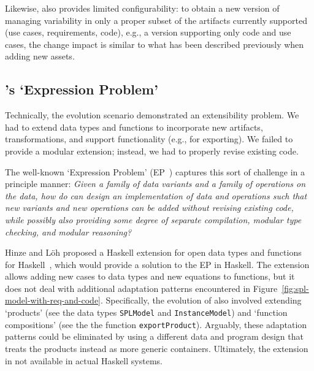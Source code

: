Likewise, \hp{} also provides limited configurability: to obtain a new
version of \hp{} managing variability in only a proper subset of the
artifacts currently supported (use cases, requirements, code), e.g., a
version supporting only code and use cases, the change impact is
similar to what has been described previously when adding new assets.


\subsection{\hp's `Expression Problem'}
\label{S:xp}

Technically, the evolution scenario demonstrated an extensibility
problem. We had to extend data types and functions to incorporate new
artifacts, transformations, and support functionality (e.g., for
exporting). We failed to provide a modular extension; instead, we had
to properly revise existing code.

The well-known `Expression Problem'
(EP~\cite{Wadler98,Lopez-HerrejonBC05}) captures this sort of
challenge in a principle manner: \emph{Given a family of data variants
  and a family of operations on the data, how do can design an
  implementation of data and operations such that new variants and new
  operations can be added without revising existing code, while
  possibly also providing some degree of separate compilation, modular
  type checking, and modular reasoning?}

Hinze and L\"oh proposed a Haskell extension for open data types and
functions for Haskell~\cite{LoehH06}, which would provide a solution
to the EP in Haskell. The extension allows adding new cases to data
types and new equations to functions, but it does not deal with
additional adaptation patterns encountered in
Figure~\ref{fig:spl-model-with-req-and-code}. Specifically, the
evolution of \hp{} also involved extending `products' (see the data
types \texttt{SPLModel} and \texttt{InstanceModel}) and `function
compositions' (see the the function \texttt{exportProduct}).
Arguably, these adaptation patterns could be eliminated by using a
different data and program design that treats the products instead as
more generic containers. Ultimately, the extension in not available in
actual Haskell systems.


